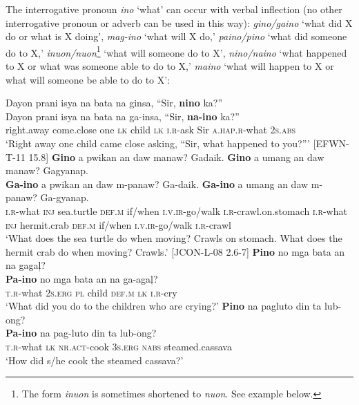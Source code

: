 The interrogative pronoun \textit{ino} ‘what’ can occur with verbal inflection (no other interrogative pronoun or adverb can be used in this way): \textit{gino/gaino} ‘what did X do or what is X doing’, \textit{mag-ino} ‘what will X do,’ \textit{paino/pino} ‘what did someone do to X,’ \textit{inuon/nuon}\footnote{The form \textit{inuon} is sometimes shortened to \textit{nuon}. See example  below.} ‘what will someone do to X', \textit{nino/naino} ‘what happened to X or what was someone able to do to X,’ \textit{maino} ‘what will happen to X or what will someone be able to do to X’:

\ea
Dayon  prani  isya  na  bata  na  ginsa,  “Sir,  \textbf{nino}  ka?” \\\smallskip
\gll Dayon  prani  isya  na  bata  na  ga-insa,  “Sir,  \textbf{na-ino}  ka?” \\
right.away  come.close  one  \textsc{lk}  child  \textsc{lk}  \textsc{i.r}-ask  Sir  \textsc{a.hap.r}-what  2\textsc{s.abs} \\
\glt ‘Right away one child came close asking, “Sir, what happened to you?”' [EFWN-T-11 15.8]
\z
\ea
\textbf{Gino}  a  pwikan  an  daw  manaw?  Gadaik. \textbf{Gino}  a  umang  an  daw  manaw?  Gagyanap. \\\smallskip
\gll \textbf{Ga-ino}  a  pwikan  an  daw  m-panaw?  Ga-daik. \textbf{Ga-ino}  a  umang  an  daw  m-panaw?  Ga-gyanap. \\
\textsc{i.r}-what  \textsc{inj}  sea.turtle  \textsc{def.m}  if/when  \textsc{i.v.ir}-go/walk  \textsc{i.r}-crawl.on.stomach
\textsc{i.r}-what  \textsc{inj}  hermit.crab  \textsc{def.m}  if/when  \textsc{i.v.ir}-go/walk  \textsc{i.r}-crawl \\
\glt `What does the sea turtle do when moving? Crawls on stomach. What does the hermit crab do when moving? Crawls.’ [JCON-L-08 2.6-7]
\z
\ea
\textbf{Pino}  no  mga  bata  an  na  gagaļ? \\\smallskip
\gll \textbf{Pa-ino}  no  mga  bata  an  na  ga-agaļ? \\
\textsc{t.r}-what  2\textsc{s.erg}  \textsc{pl}  child  \textsc{def.m}  \textsc{lk}  \textsc{i.r}-cry \\
\glt ‘What did you do to the children who are crying?’
\z
\ea
\textbf{Pino}  na  pagluto  din  ta  lub-ong? \\\smallskip
\gll \textbf{Pa-ino}  na  pag-luto  din  ta  lub-ong? \\
\textsc{t.r}-what  \textsc{lk}  \textsc{nr.act}-cook  3\textsc{s.erg}  \textsc{nabs}  steamed.cassava \\
\glt ‘How did s/he cook the steamed cassava?’
\z


